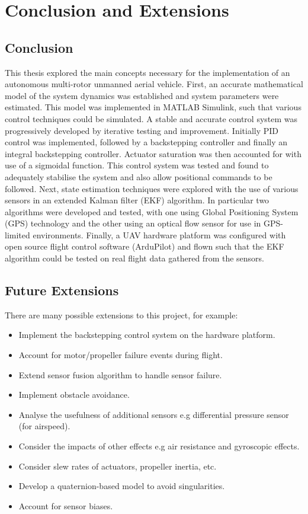 
\chapter{Conclusion and Extensions}

\section{Conclusion}
This thesis explored the main concepts necessary for the implementation of an autonomous multi-rotor unmanned aerial vehicle. First, an accurate mathematical model of the system dynamics was established and system parameters were estimated. This model was implemented in MATLAB Simulink, such that various control techniques could be simulated. A stable and accurate control system was progressively developed by iterative testing and improvement. Initially PID control was implemented, followed by a backstepping controller and finally an integral backstepping controller. Actuator saturation was then accounted for with use of a sigmoidal function. This control system was tested and found to adequately stabilise the system and also allow positional commands to be followed. Next, state estimation techniques were explored with the use of various sensors in an extended Kalman filter (EKF) algorithm. In particular two algorithms were developed and tested, with one using Global Positioning System (GPS) technology and the other using an optical flow sensor for use in GPS-limited environments. Finally, a UAV hardware platform was configured with open source flight control software (ArduPilot) and flown such that the EKF algorithm could be tested on real flight data gathered from the sensors.

\section{Future Extensions}
There are many possible extensions to this project, for example:

\begin{itemize}
\item Implement the backstepping control system on the hardware platform.
\item Account for motor/propeller failure events during flight.
\item Extend sensor fusion algorithm to handle sensor failure.
\item Implement obstacle avoidance.
\item Analyse the usefulness of additional sensors e.g differential pressure sensor (for airspeed).
\item Consider the impacts of other effects e.g air resistance and gyroscopic effects.
\item Consider slew rates of actuators, propeller inertia, etc.
\item Develop a quaternion-based model to avoid singularities.
\item Account for sensor biases.


\end{itemize}

\clearpage


